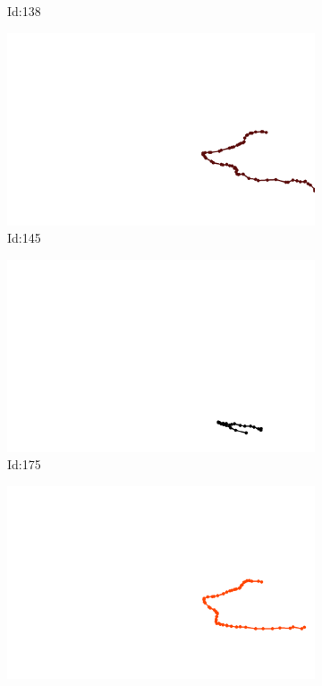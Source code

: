 \documentclass[12pt,twoside]{report}
\begin{document}
\begin{figure}
\begin{subfigure}[b]{0.20\textwidth}
\caption{Id:138}
\end{subfigure}
\begin{subfigure}[b]{0.20\textwidth}
\centering
\includegraphics[width=\textwidth]{../trajectories/145.png}
\caption{Id:145}
\end{subfigure}
\begin{subfigure}[b]{0.20\textwidth}
\centering
\includegraphics[width=\textwidth]{../trajectories/175.png}
\caption{Id:175}
\end{subfigure}
\begin{subfigure}[b]{0.20\textwidth}
\centering
\includegraphics[width=\textwidth]{../trajectories/181.png}

\end{subfigure}
\end{figure}
\end{document}
